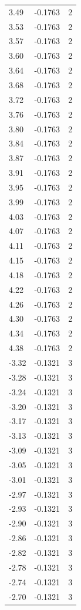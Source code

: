\begin{longtable}{lrr}
  3.49 & -0.1763 & 2 \\
  3.53 & -0.1763 & 2 \\
  3.57 & -0.1763 & 2 \\
  3.60 & -0.1763 & 2 \\
  3.64 & -0.1763 & 2 \\
  3.68 & -0.1763 & 2 \\
  3.72 & -0.1763 & 2 \\
  3.76 & -0.1763 & 2 \\
  3.80 & -0.1763 & 2 \\
  3.84 & -0.1763 & 2 \\
  3.87 & -0.1763 & 2 \\
  3.91 & -0.1763 & 2 \\
  3.95 & -0.1763 & 2 \\
  3.99 & -0.1763 & 2 \\
  4.03 & -0.1763 & 2 \\
  4.07 & -0.1763 & 2 \\
  4.11 & -0.1763 & 2 \\
  4.15 & -0.1763 & 2 \\
  4.18 & -0.1763 & 2 \\
  4.22 & -0.1763 & 2 \\
  4.26 & -0.1763 & 2 \\
  4.30 & -0.1763 & 2 \\
  4.34 & -0.1763 & 2 \\
  4.38 & -0.1763 & 2 \\
  -3.32 & -0.1321 & 3 \\
  -3.28 & -0.1321 & 3 \\
  -3.24 & -0.1321 & 3 \\
  -3.20 & -0.1321 & 3 \\
  -3.17 & -0.1321 & 3 \\
  -3.13 & -0.1321 & 3 \\
  -3.09 & -0.1321 & 3 \\
  -3.05 & -0.1321 & 3 \\
  -3.01 & -0.1321 & 3 \\
  -2.97 & -0.1321 & 3 \\
  -2.93 & -0.1321 & 3 \\
  -2.90 & -0.1321 & 3 \\
  -2.86 & -0.1321 & 3 \\
  -2.82 & -0.1321 & 3 \\
  -2.78 & -0.1321 & 3 \\
  -2.74 & -0.1321 & 3 \\
  -2.70 & -0.1321 & 3 \\

\end{longtable}
